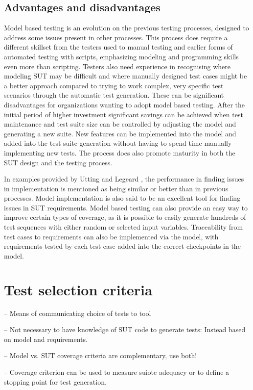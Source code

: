 \subsection{Advantages and disadvantages}
Model based testing is an evolution on the previous testing processes, designed to address some issues present in other processes. This process does require a different skillset from the testers used to manual testing and earlier forms of automated testing with scripts, emphasizing modeling and programming skills even more than scripting. Testers also need experience in recognising where modeling SUT may be difficult and where manually designed test cases might be a better approach compared to trying to work complex, very specific test scenarios through the automatic test generation. These can be significant disadvantages for organizations wanting to adopt model based testing. After the initial period of higher investment significant savings can be achieved when test maintenance and test suite size can be controlled by adjusting the model and generating a new suite. New features can be implemented into the model and added into the test suite generation without having to spend time manually implementing new tests. The process does also promote maturity in both the SUT design and the testing process. 

In examples provided by Utting and Legeard \cite{tools}, the performance in finding issues in implementation is mentioned as being similar or better than in previous processes. Model implementation is also said to be an excellent tool for finding issues in SUT requirements. Model based testing can also provide an easy way to improve certain types of coverage, as it is possible to easily generate hundreds of test sequences with either random or selected input variables. Traceability from test cases to requirements can also be implemented via the model, with requirements tested by each test case added into the correct checkpoints in the model.

\section{Test selection criteria}
-- Means of communicating choice of tests to tool

-- Not necessary to have knowledge of SUT code to generate tests: Instead based on model and requirements.

-- Model vs. SUT coverage criteria are complementary, use both!

-- Coverage criterion can be used to measure suiote adequacy or to define a stopping point for test generation.

